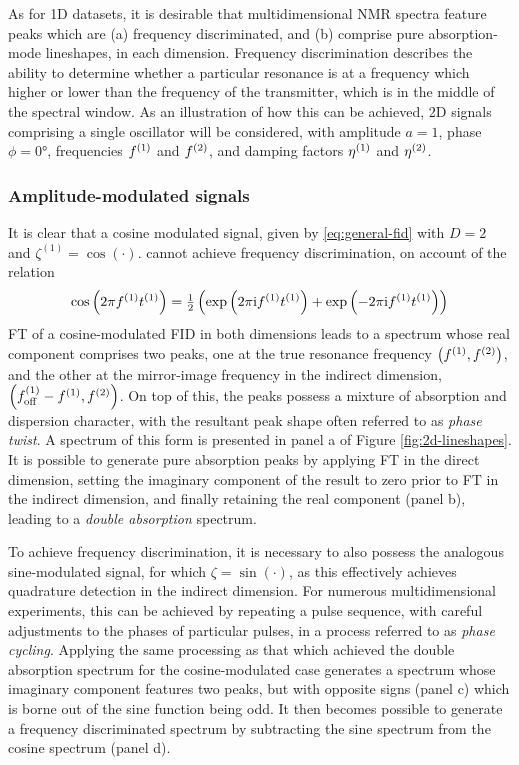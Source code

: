 As for \ac{1D} datasets, it is desirable that multidimensional \ac{NMR} spectra
feature peaks which are (a) frequency discriminated, and (b) comprise pure
absorption-mode lineshapes, in each dimension. Frequency discrimination describes
the ability to determine whether a particular resonance is at a frequency which
higher or lower than the frequency of the transmitter, which is in the middle
of the spectral window. As an illustration of how this can be achieved, \ac{2D}
signals comprising a single oscillator will be considered, with
amplitude $a = 1$,  phase $\phi = \ang{0}$, frequencies $f^{(1)}$ and $f^{(2)}$, and
damping factors $\eta^{(1)}$ and  $\eta^{(2)}$.

\subsubsection{Amplitude-modulated signals}
It is clear that a cosine modulated signal, given by \eqref{eq:general-fid}
with $D=2$ and $\zeta^{(1)} = \cos(\cdot)$. cannot achieve frequency
discrimination, on account of the relation
\begin{equation}
    \cos\left(2 \pi f^{(1)} t^{(1)}\right) =
    \tfrac{1}{2} \left(\exp\left(2 \pi \mathrm{i} f^{(1)} t^{(1)} \right) + \exp\left(-2 \pi \mathrm{i}
    f^{(1)} t^{(1)} \right)\right)
\end{equation}
\ac{FT} of a cosine-modulated \ac{FID} in both dimensions leads to a spectrum
whose real component comprises two peaks, one at the true resonance frequency
$\left(f^{(1)}, f^{(2)}\right)$, and the other at the mirror-image frequency in the
indirect dimension, $\left(f_{\mathrm{off}}^{(1)} - f^{(1)}, f^{(2)}\right)$. On top of this, the
peaks possess a mixture of absorption and dispersion character, with the
resultant peak shape often referred to as \emph{phase twist}\cite{Keeler1985}.
A spectrum of this form is presented in panel a of Figure \ref{fig:2d-lineshapes}.
It is possible to generate pure absorption peaks by applying \ac{FT} in the
direct dimension, setting the imaginary component of the result to zero
prior to \ac{FT} in the indirect dimension, and finally retaining the real
component (panel b), leading to a \emph{double absorption} spectrum.

To achieve frequency discrimination, it is necessary to also possess the
analogous sine-modulated signal, for which $\zeta = \sin(\cdot)$, as this
effectively achieves quadrature detection in the indirect dimension. For
numerous multidimensional experiments, this can be achieved by repeating a
pulse sequence, with careful adjustments to the phases of particular pulses, in
a process referred to as \emph{phase cycling}\cite[Chapter 11]{Keeler2010}.
Applying the same processing as that which achieved the double absorption
spectrum for the cosine-modulated case generates a spectrum whose imaginary
component features two peaks, but with opposite signs (panel c) which is borne
out of the sine function being odd. It then becomes possible to generate a
frequency discriminated spectrum by subtracting the sine spectrum from the
cosine spectrum (panel d).

